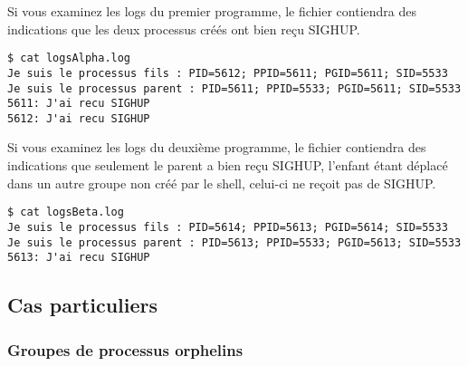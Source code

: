 Si vous examinez les logs  du premier programme, le fichier contiendra des indications que les deux processus créés ont bien reçu SIGHUP.

\begin{lstlisting}[style=blackstyle]
$ cat logsAlpha.log
Je suis le processus fils : PID=5612; PPID=5611; PGID=5611; SID=5533 
Je suis le processus parent : PID=5611; PPID=5533; PGID=5611; SID=5533 
5611: J'ai recu SIGHUP
5612: J'ai recu SIGHUP
\end{lstlisting}

Si vous examinez les logs du deuxième programme, le fichier contiendra des indications que seulement le parent a bien reçu SIGHUP,
l'enfant étant déplacé dans un autre groupe non créé par le shell, celui-ci ne reçoit pas de SIGHUP.

\begin{lstlisting}[style=blackstyle]
$ cat logsBeta.log
Je suis le processus fils : PID=5614; PPID=5613; PGID=5614; SID=5533
Je suis le processus parent : PID=5613; PPID=5533; PGID=5613; SID=5533
5613: J'ai recu SIGHUP
\end{lstlisting}

\subsection{Cas particuliers}

\subsubsection{Groupes de processus orphelins}

